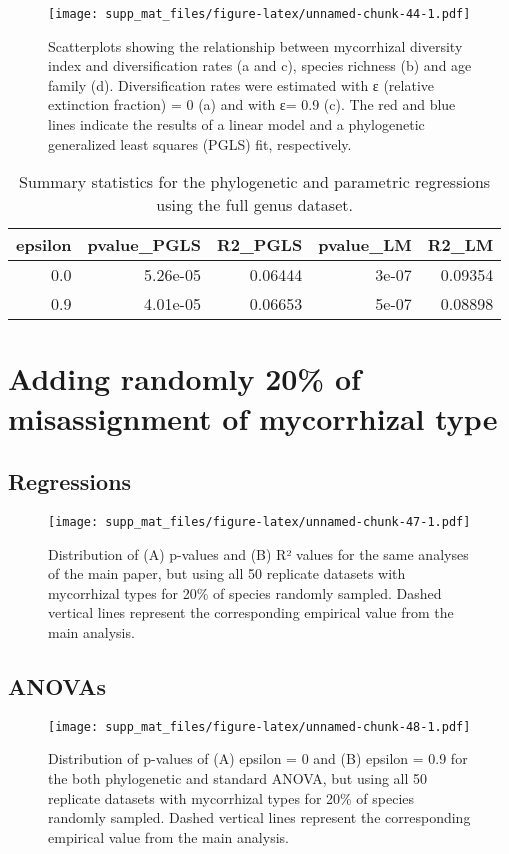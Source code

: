 \documentclass[]{article}
\begin{document}
\begin{figure}
\centering
\texttt{[image: supp\_mat\_files/figure-latex/unnamed-chunk-44-1.pdf]}
\caption{Scatterplots showing the relationship between mycorrhizal
diversity index and diversification rates (a and c), species richness
(b) and age family (d). Diversification rates were estimated with ε
(relative extinction fraction) = 0 (a) and with ε= 0.9 (c). The red and
blue lines indicate the results of a linear model and a phylogenetic
generalized least squares (PGLS) fit, respectively.}
\end{figure}

\begin{longtable}{r|r|r|r|r}
\caption{\label{tab:unnamed-chunk-45}Summary statistics for the phylogenetic and parametric regressions using the full genus dataset.}\\
\hline
epsilon & pvalue\_PGLS & R2\_PGLS & pvalue\_LM & R2\_LM\\
\hline
0.0 & 5.26e-05 & 0.06444 & 3e-07 & 0.09354\\
\hline
0.9 & 4.01e-05 & 0.06653 & 5e-07 & 0.08898\\
\hline
\end{longtable}

\hypertarget{adding-randomly-20-of-misassignment-of-mycorrhizal-type}{%
\section{Adding randomly 20\% of misassignment of mycorrhizal
type}\label{adding-randomly-20-of-misassignment-of-mycorrhizal-type}}

\hypertarget{regressions}{%
\subsection{Regressions}\label{regressions}}

\begin{figure}
\centering
\texttt{[image: supp\_mat\_files/figure-latex/unnamed-chunk-47-1.pdf]}
\caption{Distribution of (A) p-values and (B) R² values for the same
analyses of the main paper, but using all 50 replicate datasets with
mycorrhizal types for 20\% of species randomly sampled. Dashed vertical
lines represent the corresponding empirical value from the main
analysis.}
\end{figure}

\pagebreak

\hypertarget{anovas}{%
\subsection{ANOVAs}\label{anovas}}

\begin{figure}
\centering
\texttt{[image: supp\_mat\_files/figure-latex/unnamed-chunk-48-1.pdf]}
\caption{Distribution of p-values of (A) epsilon = 0 and (B) epsilon =
0.9 for the both phylogenetic and standard ANOVA, but using all 50
replicate datasets with mycorrhizal types for 20\% of species randomly
sampled. Dashed vertical lines represent the corresponding empirical
value from the main analysis.}
\end{figure}
\end{document}
